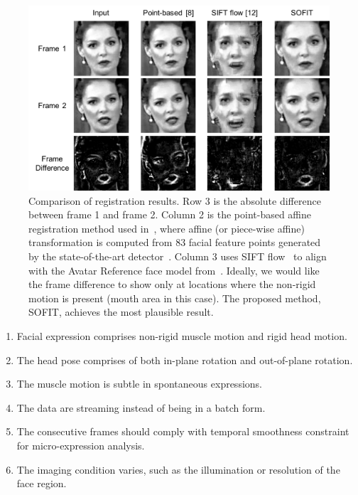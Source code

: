 \documentclass[10pt,journal]{IEEEtran}
\begin{document}
\begin{figure}[!t]
	\centering
		\includegraphics[width=\columnwidth]{fig/regComp.png}
	\caption{Comparison of registration results. Row 3 is the absolute difference between frame 1 and frame 2. Column 2 is the point-based affine registration method used in~\cite{Littlewort_CERT_FG2011,Tadas_ECCV14,Valstar_SMCB12,IntraFace,McDuff_TAC14}, where affine (or piece-wise affine) transformation is computed from 83 facial feature points generated by the state-of-the-art detector~\cite{Tadas_ECCV14}. Column 3 uses SIFT flow~\cite{Liu_PAMI11} to align with the Avatar Reference face model from~\cite{Yang_SMCB12}. Ideally, we would like the frame difference to show only at locations where the non-rigid motion is present (mouth area in this case). The proposed method, SOFIT, achieves the most plausible result.}
	\label{fig:regComp}
\end{figure}

\begin{enumerate}
\item Facial expression comprises non-rigid muscle motion and rigid head motion.
\item The head pose comprises of both in-plane rotation and out-of-plane rotation.
\item The muscle motion is subtle in spontaneous expressions.
\item The data are streaming instead of being in a batch form.
\item The consecutive frames should comply with temporal smoothness constraint for micro-expression analysis.
\item The imaging condition varies, such as the illumination or resolution of the face region.
\end{enumerate}
\end{document}

